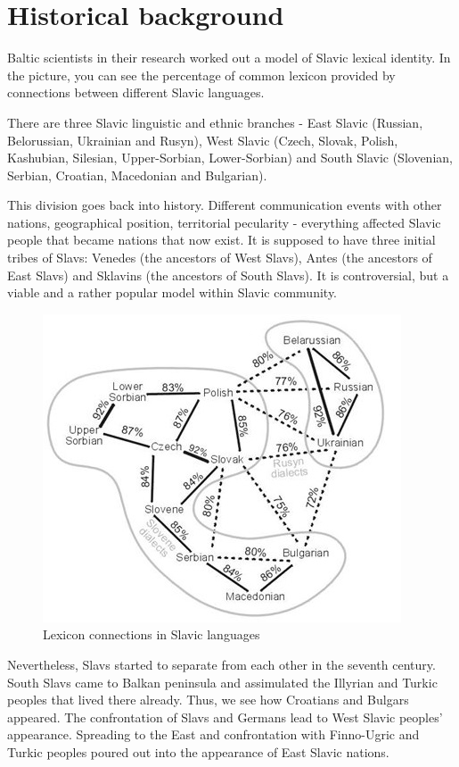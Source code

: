 \section{Historical background}

Baltic scientists in their research \cite{slavic-procent} worked out a model of Slavic lexical identity. In the picture, you can see the percentage of common lexicon provided by connections between different Slavic languages.

There are three Slavic linguistic and ethnic branches - East Slavic (Russian, Belorussian, Ukrainian and Rusyn), West Slavic (Czech, Slovak, Polish, Kashubian, Silesian, Upper-Sorbian, Lower-Sorbian) and South Slavic (Slovenian, Serbian, Croatian, Macedonian and Bulgarian).

This division goes back into history. Different communication events with other nations, geographical position, territorial pecularity - everything affected Slavic people that became nations that now exist. It is supposed to have three initial tribes of Slavs: Venedes (the ancestors of West Slavs), Antes (the ancestors of East Slavs) and Sklavins (the ancestors of South Slavs). It is controversial, but a viable and a rather popular model within Slavic community.

\begin{figure}
	\includegraphics[width=\linewidth]{./sources/percents.jpg}
	\caption{Lexicon connections in Slavic languages}
	\label{fig:percent}
\end{figure}

Nevertheless, Slavs started to separate from each other in the seventh century. South Slavs came to Balkan peninsula and assimulated the Illyrian and Turkic peoples that lived there already. Thus, we see how Croatians and Bulgars appeared. The confrontation of Slavs and Germans lead to West Slavic peoples' appearance. Spreading to the East and confrontation with Finno-Ugric and Turkic peoples poured out into the appearance of East Slavic nations.